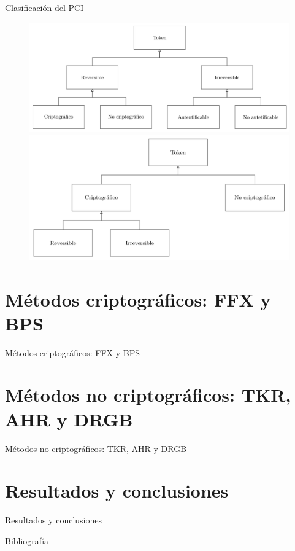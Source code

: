\documentclass{beamer}
\begin{document}
  \begin{frame}{Clasificación del PCI}
    \begin{figure}[H]
      \begin{center}
        \includegraphics[width=0.8\linewidth]{presentacion_rci/diagramas/clasificacion_pci.png}
\newline
\newline
        \includegraphics[width=0.8\linewidth]{presentacion_rci/diagramas/clasificacion_propia.png}
      \end{center}
    \end{figure}
  \end{frame}

  \section{Métodos criptográficos: FFX y BPS}

  \begin{frame}{Métodos criptográficos: FFX y BPS}

  \end{frame}

  \section{Métodos no criptográficos: TKR, AHR y DRGB}

  \begin{frame}{Métodos no criptográficos: TKR, AHR y DRGB}

  \end{frame}

  \section{Resultados y conclusiones}

  \begin{frame}{Resultados y conclusiones}

  \end{frame}

  \begin{frame}[allowframebreaks]{Bibliografía}
    \printbibliography
  \end{frame}

  \setlength{\parskip}{0.0em}

  {
  \frame{\titlepage}}
\end{document}
